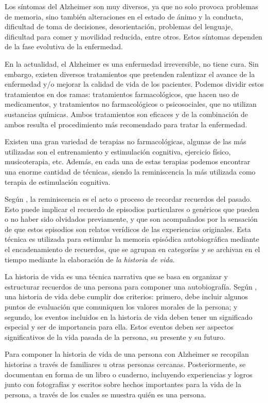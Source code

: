 Los síntomas del Alzheimer son muy diversos, ya que no solo provoca problemas de memoria, sino también alteraciones en el estado de ánimo y la conducta, dificultad de toma de decisiones, desorientación, problemas del lenguaje, dificultad para comer y movilidad reducida, entre otros. Estos síntomas dependen de la fase evolutiva de la enfermedad.

En la actualidad, el Alzheimer es una enfermedad irreversible, no tiene cura. Sin embargo, existen diversos tratamientos que pretenden ralentizar el avance de la enfermedad y/o mejorar la calidad de vida de los pacientes. Podemos dividir estos tratamientos en dos ramas: tratamientos farmacológicos, que hacen uso de medicamentos, y tratamientos no farmacológicos o psicosociales, que no utilizan sustancias químicas. Ambos tratamientos son eficaces y de la combinación de ambos resulta el procedimiento más recomendado para tratar la enfermedad.\citep{romano2007enfermedad}

Existen una gran variedad de terapias no farmacológicas, algunas de las más utilizadas son el entrenamiento y estimulación cognitiva, ejercicio físico, musicoterapia, etc. Además, en cada una de estas terapias podemos encontrar una enorme cantidad de técnicas, siendo la reminiscencia la más utilizada como terapia de estimulación cognitiva.

Según \cite{o2013cross}, la reminiscencia es el acto o proceso de recordar recuerdos del pasado. Esto puede implicar el recuerdo de episodios particulares o genéricos que pueden o no haber sido olvidados previamente, y que son acompañados por la sensación de que estos episodios son relatos verídicos de las experiencias originales. Esta técnica es utilizada para estimular la memoria episódica autobiográfica mediante el encadenamiento de recuerdos, que se agrupan en categorías y se archivan en el tiempo mediante la elaboración de \textit{la historia de vida}.

La historia de vida es una técnica narrativa que se basa en organizar y estructurar recuerdos de una persona para componer una autobiografía. Según \cite{linde1993life}, una historia de vida debe cumplir dos criterios: primero, debe incluir algunos puntos de evaluación que comuniquen los valores morales de la persona; y segundo, los eventos incluidos en la historia de vida deben tener un significado especial y ser de importancia para ella. Estos eventos deben ser aspectos significativos de la vida pasada de la persona, su presente y su futuro.

Para componer la historia de vida de una persona con Alzheimer se recopilan historias a través de familiares u otras personas cercanas. Posteriormente, se documentan en forma de un libro o cuaderno, incluyendo experiencias y logros junto con fotografías y escritos sobre hechos importantes para la vida de la persona, a través de los cuales se muestra quién es una persona.

